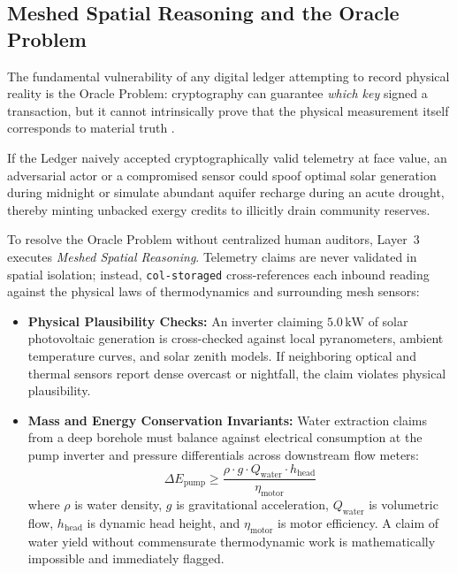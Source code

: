 \subsection{Meshed Spatial Reasoning and the Oracle Problem}

The fundamental vulnerability of any digital ledger attempting to record physical reality is the Oracle Problem: cryptography can guarantee \textit{which key} signed a transaction, but it cannot intrinsically prove that the physical measurement itself corresponds to material truth \parencite{landauer2010}.

If the Ledger naively accepted cryptographically valid telemetry at face value, an adversarial actor or a compromised sensor could spoof optimal solar generation during midnight or simulate abundant aquifer recharge during an acute drought, thereby minting unbacked exergy credits to illicitly drain community reserves. 

To resolve the Oracle Problem without centralized human auditors, Layer~3 executes \textit{Meshed Spatial Reasoning}. Telemetry claims are never validated in spatial isolation; instead, \texttt{col-storaged} cross-references each inbound reading against the physical laws of thermodynamics and surrounding mesh sensors:

\begin{itemize}
  \item \textbf{Physical Plausibility Checks:} An inverter claiming $5.0\,\mathrm{kW}$ of solar photovoltaic generation is cross-checked against local pyranometers, ambient temperature curves, and solar zenith models. If neighboring optical and thermal sensors report dense overcast or nightfall, the claim violates physical plausibility.
  \item \textbf{Mass and Energy Conservation Invariants:} Water extraction claims from a deep borehole must balance against electrical consumption at the pump inverter and pressure differentials across downstream flow meters:
  \begin{equation}
  \Delta E_{\mathrm{pump}} \ge \frac{\rho \cdot g \cdot Q_{\mathrm{water}} \cdot h_{\mathrm{head}}}{\eta_{\mathrm{motor}}}
  \label{eq:ch4_mass_energy_balance}
  \end{equation}
  where $\rho$ is water density, $g$ is gravitational acceleration, $Q_{\mathrm{water}}$ is volumetric flow, $h_{\mathrm{head}}$ is dynamic head height, and $\eta_{\mathrm{motor}}$ is motor efficiency. A claim of water yield without commensurate thermodynamic work is mathematically impossible and immediately flagged.
\end{itemize}

